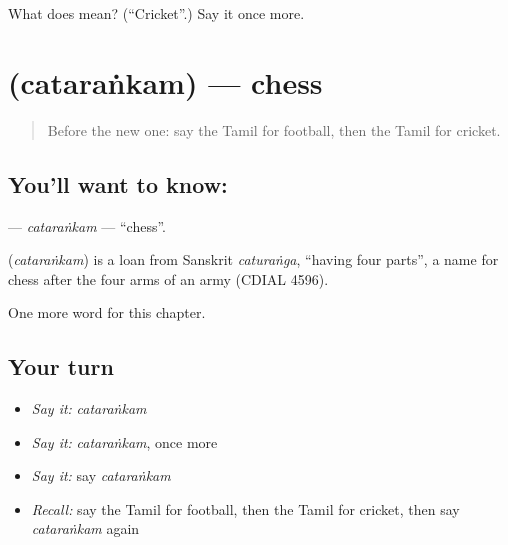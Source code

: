\begin{tcolorbox}[breakable,colback=teal!4,colframe=teal!35!black,title={Before you move on}]
What does  mean? (\textquotedblleft{}Cricket\textquotedblright{}.) Say it once more.
\end{tcolorbox}
\section[\texorpdfstring{\ta{சதுரங்கம்} (cataraṅkam)}{சதுரங்கம் (cataraṅkam)}]{ (cataraṅkam) — chess}

\label{lesson:TA-C249-catarankam}



\begin{quote}
Before the new one: say the Tamil for football, then the Tamil for cricket.
\end{quote}

\subsection*{You'll want to know: }
\textbf{} — \emph{cataraṅkam} — \textquotedblleft{}chess\textquotedblright{}.

\begin{cousinweb}
\textbf{} (\emph{cataraṅkam}) is a loan from Sanskrit \emph{caturaṅga}, \textquotedblleft{}having four parts\textquotedblright{}, a name for chess after the four arms of an army (CDIAL 4596).
\end{cousinweb}

\begin{grammarlens}[title={What you've built}]
One more word for this chapter.
\end{grammarlens}

\subsection*{Your turn}
\begin{itemize}
\raggedright
  \item \emph{Say it:} \emph{cataraṅkam}
  \item \emph{Say it:} \emph{cataraṅkam}, once more
  \item \emph{Say it:} say \emph{cataraṅkam}
  \item \emph{Recall:} say the Tamil for football, then the Tamil for cricket, then say \emph{cataraṅkam} again
\end{itemize}

